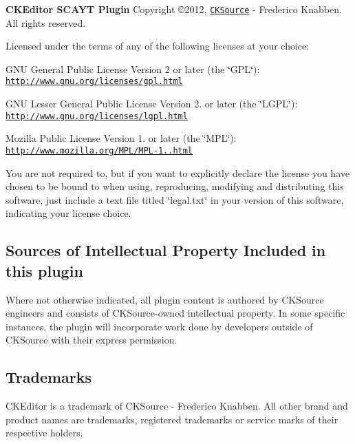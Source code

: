 {\bfseries C\-K\-Editor S\-C\-A\-Y\-T Plugin} Copyright \copyright 2012, \href{http://cksource.com}{\tt C\-K\-Source} -\/ Frederico Knabben. All rights reserved.

Licensed under the terms of any of the following licenses at your choice\-:
\begin{DoxyItemize}
\item G\-N\-U General Public License Version 2 or later (the \char`\"{}\-G\-P\-L\char`\"{})\-: \href{http://www.gnu.org/licenses/gpl.html}{\tt http\-://www.\-gnu.\-org/licenses/gpl.\-html}
\item G\-N\-U Lesser General Public License Version 2. or later (the \char`\"{}\-L\-G\-P\-L\char`\"{})\-: \href{http://www.gnu.org/licenses/lgpl.html}{\tt http\-://www.\-gnu.\-org/licenses/lgpl.\-html}
\item Mozilla Public License Version 1. or later (the \char`\"{}\-M\-P\-L\char`\"{})\-: \href{http://www.mozilla.org/MPL/MPL-1.1.html}{\tt http\-://www.\-mozilla.\-org/\-M\-P\-L/\-M\-P\-L-\/1..\-html}
\end{DoxyItemize}

You are not required to, but if you want to explicitly declare the license you have chosen to be bound to when using, reproducing, modifying and distributing this software, just include a text file titled \char`\"{}legal.\-txt\char`\"{} in your version of this software, indicating your license choice.

\subsection*{Sources of Intellectual Property Included in this plugin }

Where not otherwise indicated, all plugin content is authored by C\-K\-Source engineers and consists of C\-K\-Source-\/owned intellectual property. In some specific instances, the plugin will incorporate work done by developers outside of C\-K\-Source with their express permission.

\subsection*{Trademarks }

C\-K\-Editor is a trademark of C\-K\-Source -\/ Frederico Knabben. All other brand and product names are trademarks, registered trademarks or service marks of their respective holders. 